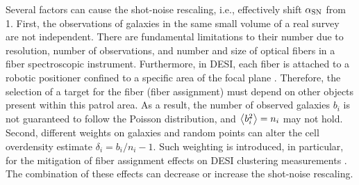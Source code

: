 Several factors can cause the shot-noise rescaling, i.e., effectively shift $\alpha_{\rm SN}$ from 1.
First, the observations of galaxies in the same small volume of a real survey are not independent.
There are fundamental limitations to their number due to resolution, number of observations, and number and size of optical fibers in a fiber spectroscopic instrument.
Furthermore, in DESI, each fiber is attached to a robotic positioner confined to a specific area of the focal plane \citep{FocalPlane.Silber.2023}.
Therefore, the selection of a target for the fiber (fiber assignment) must depend on other objects present within this patrol area.
As a result, the number of observed galaxies $b_i$ is not guaranteed to follow the Poisson distribution, and $\ev{b_i^2}=n_i$ may not hold.
Second, different weights on galaxies and random points can alter the cell overdensity estimate $\delta_i = b_i/n_i - 1$.
Such weighting is introduced, in particular, for the mitigation of fiber assignment effects on DESI clustering measurements \citep{KP3s6-Bianchi,KP3s15-Ross}.
The combination of these effects can decrease or increase the shot-noise rescaling.

